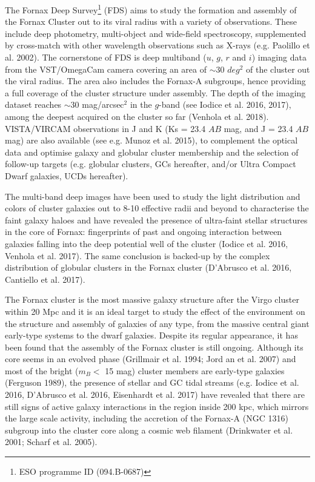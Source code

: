 \documentclass[useAMS,usenatbib]{mn2e}
\begin{document}
The Fornax Deep Survey\footnote{ESO programme ID (094.B-0687)} (FDS) aims to 
study the formation and assembly of the Fornax Cluster out to its viral radius 
with a variety of observations. These include
deep photometry, multi-object and wide-field spectroscopy, supplemented by 
cross-match with other wavelength observations such as  X-rays (e.g. Paolillo 
et al. 2002).
The cornerstone of FDS is deep multiband ($u$, $g$, $r$ and $i$) imaging data 
from the VST/OmegaCam camera covering an area of $\sim30$ $deg^2$ of the 
cluster out the viral radius. The area also includes the Fornax-A subgroups, 
hence providing a full coverage of the cluster structure under assembly.  The 
depth of the imaging dataset reaches $\sim 30$ mag/arcsec$^2$ in the $g$-band 
(see Iodice et al. 2016, 2017), among the deepest acquired on the cluster so 
far (Venhola et al. 2018). VISTA/VIRCAM observations in J and K (Ks = 23.4 $AB$ 
mag, and J = 23.4 $AB$ mag) are also available (see e.g. Munoz et al. 2015), to 
complement the optical data and optimise galaxy and globular cluster membership 
and the selection of follow-up targets (e.g. globular clusters, GCs hereafter, 
and/or Ultra Compact Dwarf galaxies, UCDs hereafter). 

The multi-band deep images have been used to study the light distribution and 
colors of cluster galaxies out to 8-10 effective radii and beyond to 
characterise the faint galaxy haloes and have revealed the presence of 
ultra-faint stellar structures in the core of Fornax: fingerprints of past and 
ongoing interaction between galaxies falling into the deep potential well of 
the cluster (Iodice et al. 2016, Venhola et al. 2017). The same conclusion is 
backed-up by the complex distribution of globular clusters in the Fornax 
cluster (D’Abrusco et al. 2016, Cantiello et al. 2017).

The Fornax cluster is the most massive galaxy structure after the Virgo cluster 
within 20 Mpc and it is an ideal target to study the effect of the environment 
on the structure and assembly of galaxies of any type, from the massive central 
giant early-type systems to the dwarf galaxies. Despite its regular appearance, 
it has been found that the assembly of the Fornax cluster is still ongoing. 
Although its core seems in an evolved phase (Grillmair et al. 1994; Jord an et 
al. 2007) and most of the bright ($m_B < $  15 mag) cluster members are 
early-type galaxies (Ferguson 1989), the presence of stellar and GC tidal 
streams (e.g. Iodice et al. 2016, D’Abrusco et al. 2016, Eisenhardt et al. 
2017) have revealed that there are still signs of active galaxy interactions in 
the region inside 200 kpc, which mirrors the large scale activity, including 
the accretion of the Fornax-A (NGC 1316) subgroup into the cluster core along a 
cosmic web filament (Drinkwater et al. 2001; Scharf et al. 2005).
\end{document}
